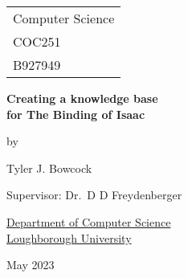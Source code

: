 \documentclass[a4paper]{report}
\begin{document}



\thispagestyle{empty}

\fancypage{}{\fbox}


\Large{
    \hfill \begin{tabular}{l}
        Computer Science \\
        COC251 \\
        B927949
    \end{tabular}
    }
    
    
    \begin{center}
\vspace*{\fill}

\Large{\textbf{Creating a knowledge base \\for The Binding of Isaac}}

\vspace*{\fill}

by

\vspace*{\fill}

Tyler J. Bowcock


\vspace*{\fill}
Supervisor: Dr.\ D D Freydenberger
\vspace*{\fill}

\underline{Department of Computer Science} \\
\underline{Loughborough University}

\vspace*{\fill}
May 2023

\end{center}


\newpage

\fancypage{}{}
\end{document}
